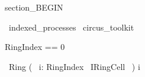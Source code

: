 section_BEGIN
\begin{zsection}
  \SECTION\ indexed\_processes \parents\ circus\_toolkit
\end{zsection}

\begin{zed}
     RingIndex == 0 
\end{zed}

\begin{circus}
	\circprocess\ Ring \circdef (~ \Interleave i: RingIndex \circindex\ IRingCell ~) \circlinst i \circrinst 
\end{circus}

